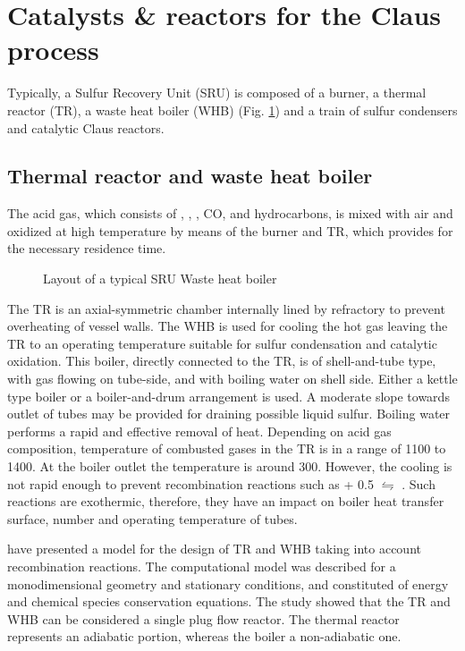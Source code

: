 \section{Catalysts \& reactors for the Claus process}
Typically, a Sulfur Recovery Unit (SRU) is composed of a burner, a thermal reactor (TR), a waste heat boiler (WHB) (Fig. \ref{fig:whb}) and a train of sulfur condensers and catalytic Claus reactors. 

\subsection{Thermal reactor and waste heat boiler}
The acid gas, which consists of , , , CO,  and hydrocarbons, is mixed with air and oxidized at high temperature by means of the burner and TR, which provides for the necessary residence time.

\begin{figure}[htbp]
\centering
{}
\caption{Layout of a typical SRU Waste heat boiler \citep{Manenti2012376}}
\label{fig:whb}
\end{figure}

The TR is an axial-symmetric chamber internally lined by refractory to prevent overheating of vessel walls. The WHB is used for cooling the hot gas leaving the TR to an operating temperature suitable for sulfur condensation and catalytic oxidation. This boiler, directly connected to the TR, is of shell-and-tube type, with gas flowing on tube-side, and with boiling water on shell side. Either a kettle type boiler or a boiler-and-drum arrangement is used. A moderate slope towards outlet of tubes may be provided for draining possible liquid sulfur. Boiling water performs a rapid and effective removal of heat. Depending on acid gas composition, temperature of combusted gases in the TR is in a range of 1100 to 1400\textcelsius{}. At the boiler outlet the temperature is around 300\textcelsius{}. However, the cooling is not rapid enough to prevent recombination reactions such as  + 0.5 $\leftrightharpoons$ . Such reactions are exothermic, therefore, they have an impact on boiler heat transfer surface, number and operating temperature of tubes. 

\cite{Manenti2012376} have presented a model for the design of TR and WHB taking into account recombination reactions. The computational model was described for a monodimensional geometry and stationary conditions, and constituted of energy and chemical species conservation equations. The study showed that the TR and WHB can be considered a single plug flow reactor. The thermal reactor represents an adiabatic portion, whereas the boiler a non-adiabatic one.

